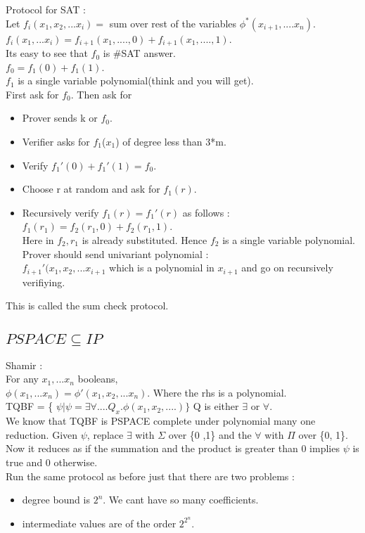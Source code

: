 \documentclass[solution,addpoints,12pt]{exam}
\begin{document}
Protocol for SAT :\\
Let $f_i(x_1, x_2,...x_i) = $ sum over rest of the variables
$\phi^*(x_{i+1}, .... x_n)$.\\
$f_i(x_1, ... x_i) = f_{i+1}(x_1, .... ,0) + f_{i+1}(x_1, .... , 1)$.\\
Its easy to see that $f_0$ is \#SAT answer.\\
$f_0 = f_1(0) + f_1(1)$.\\
$f_1$ is a single variable polynomial(think and you will get).\\
First ask for $f_0$. Then ask for
\begin{itemize}
\item Prover sends k or $f_0$.
\item Verifier asks for $f_1$($x_1$) of degree less than 3*m.
\item Verify $f_1 '(0) + f_1 '(1) = f_0$.
\item Choose r at random and ask for $f_1(r)$.
\item Recursively verify $f_1(r) = f_1 '(r)$ as follows :
$f_1(r_1) = f_2(r_1, 0) + f_2(r_1, 1)$.\\
Here in $f_2, r_1$ is already substituted. Hence $f_2$
is a single variable polynomial.\\
Prover should send univariant polynomial :\\
$f_{i+1}'(x_1, x_2, ... x_{i+1}$ which is a polynomial
in $x_{i+1}$ and go on recursively verifiying.
\end{itemize}
This is called the sum check protocol.
\subsection{$PSPACE \subseteq IP$}
Shamir :\\
For any $x_1, ... x_n$ booleans,\\
$\phi(x_1, ... x_n) = \phi'(x_1, x_2, ... x_n)$.
Where the rhs is a polynomial.\\
TQBF = \{ $\psi | \psi = \exists \forall .... Q_x.\phi(x_1, x_2, ....)\}$
Q is either $\exists$ or $\forall$.\\
We know that TQBF is PSPACE complete under polynomial many one
reduction. Given $\psi$, replace $\exists$ with
$\Sigma$ over \{0 ,1\} and the $\forall$ with $\Pi$ over \{0, 1\}.
Now it reduces as if the summation and the product is greater than 0
implies $\psi$ is true and 0 otherwise.\\
Run the same protocol as before just that there are two problems : \\
\begin{itemize}
\item degree bound is $2^n$. We cant have so many coefficients.
\item intermediate values are of the order $2^{2^n}$.
\end{itemize}
\end{document}
